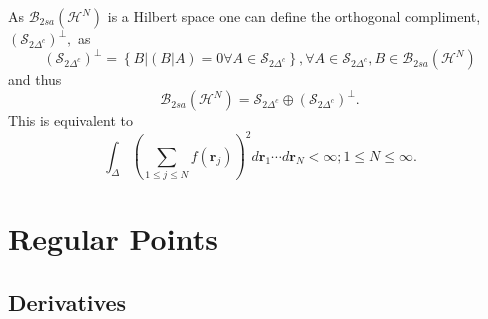 \documentclass[aps,preprint]{revtex4}%
\begin{document}
As $\mathcal{B}_{2sa}\left(  \mathcal{H}^{N}\right)  $ is a Hilbert space one
can define the orthogonal compliment, $\left(  \mathcal{S}_{2\Delta^{c}%
}\right)  ^{\bot},$ as
\begin{equation}
\left(  \mathcal{S}_{2\Delta^{c}}\right)  ^{\bot}=\left\{  B\left\vert \left(
B\left\vert A\right.  \right)  =0\forall A\in\mathcal{S}_{2\Delta^{c}}\right.
\right\}  ,\forall A\in\mathcal{S}_{2\Delta^{c}},B\in\mathcal{B}_{2sa}\left(
\mathcal{H}^{N}\right) \nonumber
\end{equation}
and thus
\begin{equation}
\mathcal{B}_{2sa}\left(  \mathcal{H}^{N}\right)  =\mathcal{S}_{2\Delta^{c}%
}\oplus\left(  \mathcal{S}_{2\Delta^{c}}\right)  ^{\bot}.
\end{equation}
This is equivalent to
\begin{equation}
\int_{\Delta}\left(  \sum_{1\leq j\leq N}f\left(  \boldsymbol{r}_{j}\right)
\right)  ^{2}d\boldsymbol{r}_{1}\boldsymbol{\cdots}d\boldsymbol{r}_{N}%
<\infty;1\leq N\leq\infty.
\end{equation}


\section{Regular Points \label{Regular}}

\subsection{Derivatives \label{DerivDef}}
\end{document}
